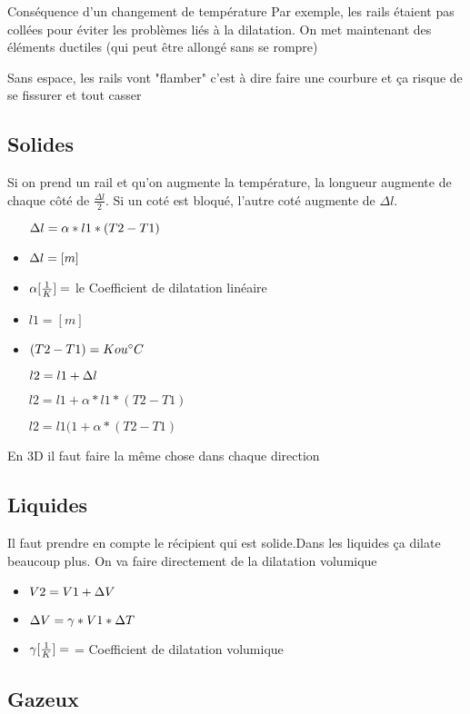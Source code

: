 
Conséquence d'un changement de température
Par exemple, les rails étaient pas collées pour éviter les problèmes liés à la dilatation. On met maintenant des éléments ductiles (qui peut être allongé sans se rompre)

Sans espace, les rails vont "flamber" c'est à dire faire une courbure et ça risque de se fissurer et tout casser

\subsection{Solides}
Si on prend un rail et qu'on augmente la température, la longueur augmente de chaque côté de $\frac{{\Delta}l}{2}$. Si un coté est bloqué, l'autre coté augmente de  ${\Delta}l$.

\begin{itemize}
    \item[$\dl = \alpha * l1 * (T2 - T1)$]
    \item $\dl = [m]$
    \item $\alpha [\dila]= $ le Coefficient de dilatation linéaire
    \item $l1 = [m]$
    \item $(T2 - T1) = K ou \celsius$
    \item[$l2 = l1 + \dl$]
    \item[$l2 = l1 + \alpha * l1 * (T2 - T1)$]
    \item[$l2 = l1 (1+\alpha*(T2-T1)$]
\end{itemize}

En 3D il faut faire la même chose dans chaque direction

\subsection{Liquides}
Il faut prendre en compte le récipient qui est solide.Dans les liquides ça dilate beaucoup plus. On va faire directement de la dilatation volumique

\begin{itemize}
    \item $V2 = V1 + \dV$
    \item $\dV = \gamma * V1 * \dT$
    \item $\gamma [\dila] =$ = Coefficient de dilatation volumique
\end{itemize}

\subsection{Gazeux}
